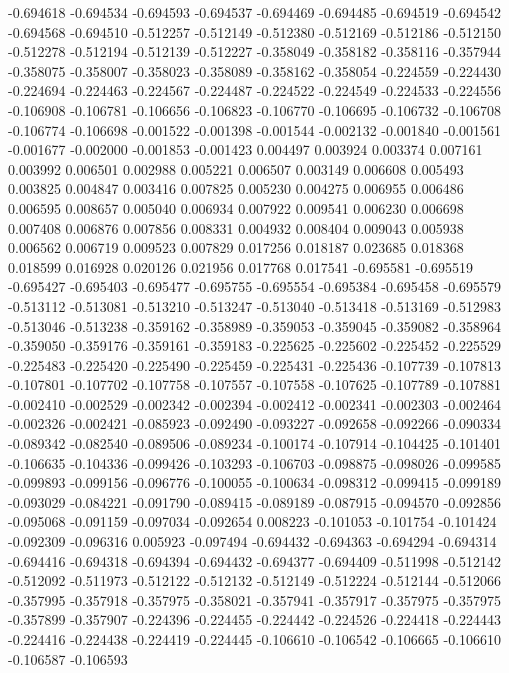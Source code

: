 -0.694618
-0.694534
-0.694593
-0.694537
-0.694469
-0.694485
-0.694519
-0.694542
-0.694568
-0.694510
-0.512257
-0.512149
-0.512380
-0.512169
-0.512186
-0.512150
-0.512278
-0.512194
-0.512139
-0.512227
-0.358049
-0.358182
-0.358116
-0.357944
-0.358075
-0.358007
-0.358023
-0.358089
-0.358162
-0.358054
-0.224559
-0.224430
-0.224694
-0.224463
-0.224567
-0.224487
-0.224522
-0.224549
-0.224533
-0.224556
-0.106908
-0.106781
-0.106656
-0.106823
-0.106770
-0.106695
-0.106732
-0.106708
-0.106774
-0.106698
-0.001522
-0.001398
-0.001544
-0.002132
-0.001840
-0.001561
-0.001677
-0.002000
-0.001853
-0.001423
0.004497
0.003924
0.003374
0.007161
0.003992
0.006501
0.002988
0.005221
0.006507
0.003149
0.006608
0.005493
0.003825
0.004847
0.003416
0.007825
0.005230
0.004275
0.006955
0.006486
0.006595
0.008657
0.005040
0.006934
0.007922
0.009541
0.006230
0.006698
0.007408
0.006876
0.007856
0.008331
0.004932
0.008404
0.009043
0.005938
0.006562
0.006719
0.009523
0.007829
0.017256
0.018187
0.023685
0.018368
0.018599
0.016928
0.020126
0.021956
0.017768
0.017541
-0.695581
-0.695519
-0.695427
-0.695403
-0.695477
-0.695755
-0.695554
-0.695384
-0.695458
-0.695579
-0.513112
-0.513081
-0.513210
-0.513247
-0.513040
-0.513418
-0.513169
-0.512983
-0.513046
-0.513238
-0.359162
-0.358989
-0.359053
-0.359045
-0.359082
-0.358964
-0.359050
-0.359176
-0.359161
-0.359183
-0.225625
-0.225602
-0.225452
-0.225529
-0.225483
-0.225420
-0.225490
-0.225459
-0.225431
-0.225436
-0.107739
-0.107813
-0.107801
-0.107702
-0.107758
-0.107557
-0.107558
-0.107625
-0.107789
-0.107881
-0.002410
-0.002529
-0.002342
-0.002394
-0.002412
-0.002341
-0.002303
-0.002464
-0.002326
-0.002421
-0.085923
-0.092490
-0.093227
-0.092658
-0.092266
-0.090334
-0.089342
-0.082540
-0.089506
-0.089234
-0.100174
-0.107914
-0.104425
-0.101401
-0.106635
-0.104336
-0.099426
-0.103293
-0.106703
-0.098875
-0.098026
-0.099585
-0.099893
-0.099156
-0.096776
-0.100055
-0.100634
-0.098312
-0.099415
-0.099189
-0.093029
-0.084221
-0.091790
-0.089415
-0.089189
-0.087915
-0.094570
-0.092856
-0.095068
-0.091159
-0.097034
-0.092654
0.008223
-0.101053
-0.101754
-0.101424
-0.092309
-0.096316
0.005923
-0.097494
-0.694432
-0.694363
-0.694294
-0.694314
-0.694416
-0.694318
-0.694394
-0.694432
-0.694377
-0.694409
-0.511998
-0.512142
-0.512092
-0.511973
-0.512122
-0.512132
-0.512149
-0.512224
-0.512144
-0.512066
-0.357995
-0.357918
-0.357975
-0.358021
-0.357941
-0.357917
-0.357975
-0.357975
-0.357899
-0.357907
-0.224396
-0.224455
-0.224442
-0.224526
-0.224418
-0.224443
-0.224416
-0.224438
-0.224419
-0.224445
-0.106610
-0.106542
-0.106665
-0.106610
-0.106587
-0.106593
